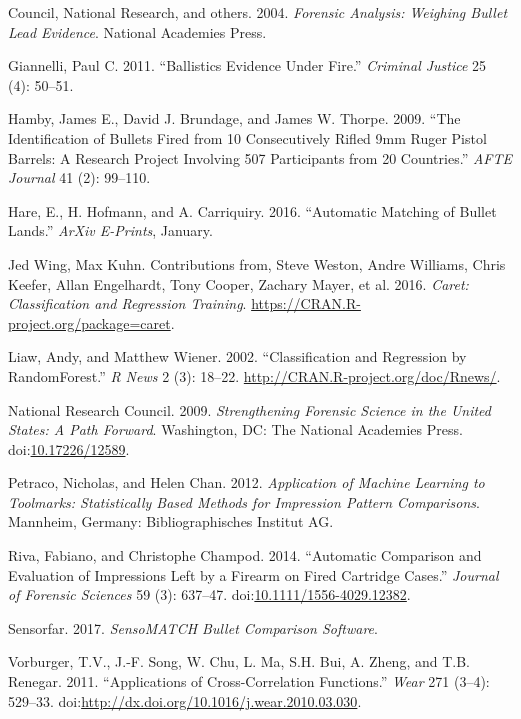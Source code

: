 \documentclass[12pt,]{article}
\theoremstyle{definition}
\theoremstyle{definition}
\theoremstyle{definition}
\theoremstyle{remark}
\begin{document}
\hypertarget{ref-national2004forensic}{}
Council, National Research, and others. 2004. \emph{Forensic Analysis:
Weighing Bullet Lead Evidence}. National Academies Press.

\hypertarget{ref-giannelli:2011}{}
Giannelli, Paul C. 2011. ``Ballistics Evidence Under Fire.''
\emph{Criminal Justice} 25 (4): 50--51.

\hypertarget{ref-hamby:2009}{}
Hamby, James E., David J. Brundage, and James W. Thorpe. 2009. ``The
Identification of Bullets Fired from 10 Consecutively Rifled 9mm Ruger
Pistol Barrels: A Research Project Involving 507 Participants from 20
Countries.'' \emph{AFTE Journal} 41 (2): 99--110.

\hypertarget{ref-2016arXiv160105788H}{}
Hare, E., H. Hofmann, and A. Carriquiry. 2016. ``Automatic Matching of
Bullet Lands.'' \emph{ArXiv E-Prints}, January.

\hypertarget{ref-caretpkg}{}
Jed Wing, Max Kuhn. Contributions from, Steve Weston, Andre Williams,
Chris Keefer, Allan Engelhardt, Tony Cooper, Zachary Mayer, et al. 2016.
\emph{Caret: Classification and Regression Training}.
\url{https://CRAN.R-project.org/package=caret}.

\hypertarget{ref-randomForest}{}
Liaw, Andy, and Matthew Wiener. 2002. ``Classification and Regression by
RandomForest.'' \emph{R News} 2 (3): 18--22.
\url{http://CRAN.R-project.org/doc/Rnews/}.

\hypertarget{ref-NAS:2009}{}
National Research Council. 2009. \emph{Strengthening Forensic Science in
the United States: A Path Forward}. Washington, DC: The National
Academies Press.
doi:\href{https://doi.org/10.17226/12589}{10.17226/12589}.

\hypertarget{ref-petraco:2012}{}
Petraco, Nicholas, and Helen Chan. 2012. \emph{Application of Machine
Learning to Toolmarks: Statistically Based Methods for Impression
Pattern Comparisons}. Mannheim, Germany: Bibliographisches Institut AG.

\hypertarget{ref-riva:2014}{}
Riva, Fabiano, and Christophe Champod. 2014. ``Automatic Comparison and
Evaluation of Impressions Left by a Firearm on Fired Cartridge Cases.''
\emph{Journal of Forensic Sciences} 59 (3): 637--47.
doi:\href{https://doi.org/10.1111/1556-4029.12382}{10.1111/1556-4029.12382}.

\hypertarget{ref-sensorfar}{}
Sensorfar. 2017. \emph{SensoMATCH Bullet Comparison Software}.

\hypertarget{ref-vorburger:2011}{}
Vorburger, T.V., J.-F. Song, W. Chu, L. Ma, S.H. Bui, A. Zheng, and T.B.
Renegar. 2011. ``Applications of Cross-Correlation Functions.''
\emph{Wear} 271 (3--4): 529--33.
doi:\href{https://doi.org/http://dx.doi.org/10.1016/j.wear.2010.03.030}{http://dx.doi.org/10.1016/j.wear.2010.03.030}.
\end{document}
